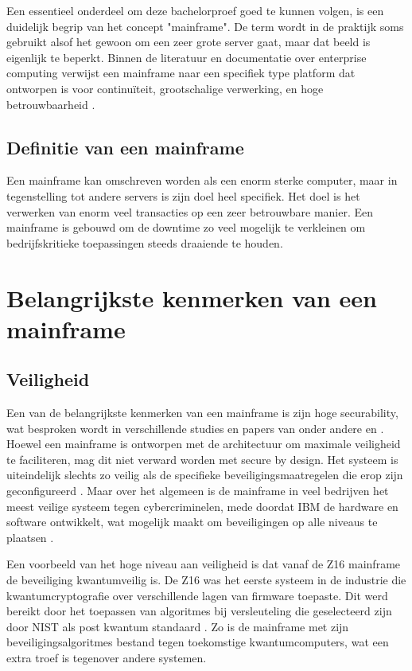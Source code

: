 Een essentieel onderdeel om deze bachelorproef goed te kunnen volgen, is een duidelijk begrip van het concept "mainframe".
De term wordt in de praktijk soms gebruikt alsof het gewoon om een zeer grote server gaat, maar dat beeld is eigenlijk te beperkt.
Binnen de literatuur en documentatie over enterprise computing verwijst een mainframe naar een specifiek type platform dat ontworpen is voor continuïteit,
grootschalige verwerking, en hoge betrouwbaarheid \autocite{spruth2010}.

\subsection{Definitie van een mainframe}%
\label{sec:definitie-mainframe}

Een mainframe kan omschreven worden als een enorm sterke computer, maar in tegenstelling tot andere servers is zijn doel heel specifiek.
Het doel is het verwerken van enorm veel transacties op een zeer betrouwbare manier.
Een mainframe is gebouwd om de downtime zo veel mogelijk te verkleinen om bedrijfskritieke toepassingen steeds draaiende te houden.

\section{Belangrijkste kenmerken van een mainframe}
\label{sec:kenmerken-mainframe}

\subsection{Veiligheid}%
\label{sec:Veiligheid-mainframe}

Een van de belangrijkste kenmerken van een mainframe is zijn hoge securability,
 wat besproken wordt in verschillende studies en papers van onder andere \cite{spruth2010} en \cite{ebbers2005}.
Hoewel een mainframe is ontworpen met de architectuur om maximale veiligheid te faciliteren, 
mag dit niet verward worden met secure by design. 
Het systeem is uiteindelijk slechts zo veilig als de specifieke beveiligingsmaatregelen die erop zijn geconfigureerd \autocite{buecker2016security}.
Maar over het algemeen is de mainframe in veel bedrijven het meest veilige systeem tegen cybercriminelen,
 mede doordat IBM de hardware en software ontwikkelt, wat mogelijk maakt om beveiligingen op alle niveaus te plaatsen \autocite{buecker2016security}.

Een voorbeeld van het hoge niveau aan veiligheid is dat vanaf de Z16 mainframe de beveiliging kwantumveilig is.
De Z16 was het eerste systeem in de industrie die kwantumcryptografie over verschillende lagen van firmware toepaste.
Dit werd bereikt door het toepassen van algoritmes bij versleuteling die geselecteerd zijn door NIST als post kwantum standaard \autocite{bradbury2021quantumsafe}.
Zo is de mainframe met zijn beveiligingsalgoritmes bestand tegen toekomstige kwantumcomputers, wat een extra troef is tegenover andere systemen.



